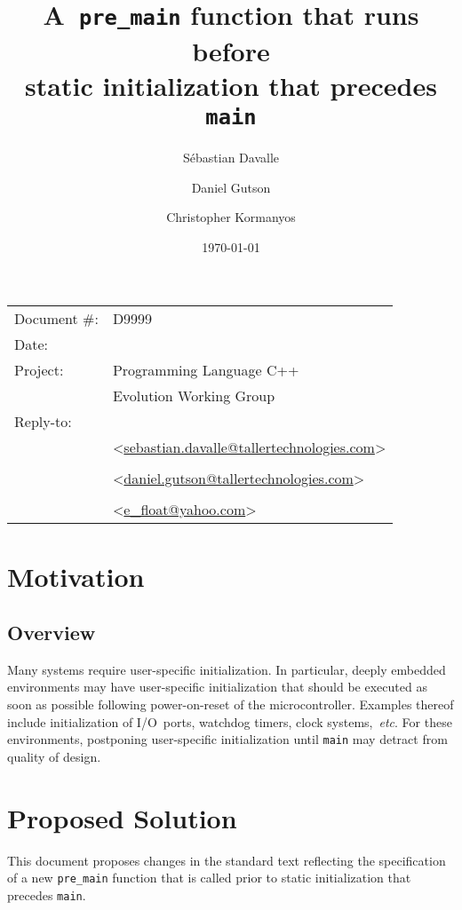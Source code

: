 \documentclass[11pt]{article}
\date{}
\title{\textbf{A~\lstinline{pre_main} function that runs before\\
                static initialization that precedes \lstinline{main}}}
\author{}
\makeatletter
\newcommand{\emailSD}{\href{mailto:sebastian.davalle@tallertechnologies.com}{sebastian.davalle@tallertechnologies.com}}
\newcommand{\emailDG}{\href{mailto:daniel.gutson@tallertechnologies.com}{daniel.gutson@tallertechnologies.com}}
\newcommand{\emailCK}{\href{mailto:e\_float@yahoo.com}{e\_float@yahoo.com}}
\makeatother
\begin{document}
\maketitle\vspace{-2cm}

\begin{flushright}
  \begin{tabular}{ll}
  Document \#:&D9999\\
  Date:       &\date{\today}\\
  Project:    &Programming Language C++\\
              &Evolution Working Group\\
  Reply-to:   &\author{S\'{e}bastian Davalle}\\
              &\textless\emailSD\textgreater\\
              &\author{Daniel Gutson}\\
              &\textless\emailDG\textgreater\\
              &\author{Christopher Kormanyos}\\
              &\textless\emailCK\textgreater\\
  \end{tabular}
\end{flushright}

\section{Motivation}
\subsection*{Overview}
Many systems require user-specific initialization. In particular,
deeply embedded environments may have user-specific initialization
that should be executed as soon as possible following power-on-reset
of the microcontroller.
Examples thereof include initialization of I/O~ports, watchdog timers,
clock systems,~\emph{etc}. For these environments, postponing
user-specific initialization until \lstinline{main} may detract from
quality of design.

\section{Proposed Solution}
This document proposes changes in the standard text reflecting
the specification of a new \lstinline{pre_main} function
that is called prior to static initialization that
precedes \lstinline{main}.
\end{document}
